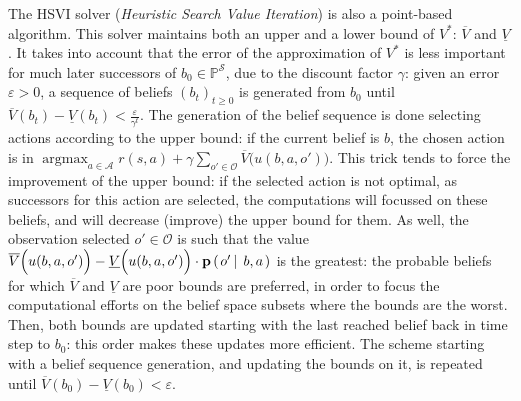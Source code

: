 The HSVI solver (\textit{Heuristic Search Value Iteration}) \cite{Smith:2004:HSV:1036843.1036906} is also a point-based algorithm.
This solver maintains both an upper and a lower bound of $V^*$: $\overline{V}$ and $\underline{V}$.
It takes into account that the error of the approximation of $V^*$ 
is less important for much later successors of $b_0 \in \mathbb{P}^{\mathcal{S}}$,
due to the discount factor $\gamma$:
given an error $\varepsilon>0$, a sequence of beliefs $(b_t)_{t\geqslant0}$ is generated
from $b_0$ until $\overline{V}(b_t) - \underline{V}(b_t) < \frac{\varepsilon}{\gamma^t}$. 
The generation of the belief sequence is done selecting actions 
according to the upper bound: if the current belief is $b$, the chosen action is in
$\operatorname*{argmax}_{a \in \mathcal{A}} r(s,a) + \gamma \sum_{o' \in \mathcal{O}} \overline{V}\Big(u(b,a,o')\Big)$.
This trick tends to force the improvement of the upper bound: if the selected action is not optimal,
as successors for this action are selected, the computations will focussed on
these beliefs, and will decrease (improve) the upper bound for them.
As well, the observation selected $o' \in \mathcal{O}$ is such that 
the value $\overline{V}\Big(u(b,a,o')\Big) - \underline{V}\Big(u(b,a,o')\Big) \cdot \textbf{p} \left( \left.  o' \, \right| \left. \, b, a  \right. \right)$ is the greatest:
the probable beliefs for which $\overline{V}$ and $\underline{V}$
are poor bounds are preferred, in order to focus the computational efforts
on the belief space subsets where the bounds are the worst. 
Then, both bounds are updated starting with the last reached belief
back in time step to $b_0$: this order makes these updates more efficient.
The scheme starting with a belief sequence generation, and updating the bounds on it,
is repeated until $\overline{V}(b_0) - \underline{V}(b_0) < \varepsilon$.

